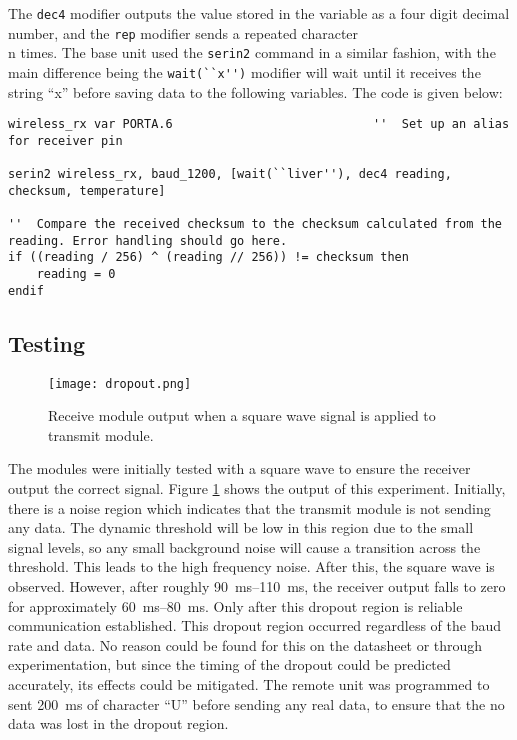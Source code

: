 The \verb|dec4| modifier outputs the value stored in the variable as a four digit decimal number, and the \verb|rep| modifier sends a repeated character \\n times. The base unit used the \verb|serin2| command in a similar fashion, with the main difference being the \verb|wait(``x'')| modifier will wait until it receives the string ``x'' before saving data to the following variables. The code is given below:

\begin{lstlisting}
wireless_rx var PORTA.6                            ''  Set up an alias for receiver pin

serin2 wireless_rx, baud_1200, [wait(``liver''), dec4 reading, checksum, temperature]

''  Compare the received checksum to the checksum calculated from the reading. Error handling should go here.
if ((reading / 256) ^ (reading // 256)) != checksum then
    reading = 0
endif
\end{lstlisting}





\subsection{Testing}
\begin{figure}[htbp]
	\centering
	\texttt{[image: dropout.png]}
	\caption{Receive module output when a square wave signal is applied to transmit module.}
	\label{fig: dropout}
\end{figure}

The modules were initially tested with a square wave to ensure the receiver output the correct signal. Figure \ref{fig: dropout} shows the output of this experiment. Initially, there is a noise region which indicates that the transmit module is not sending any data. The dynamic threshold will be low in this region due to the small signal levels, so any small background noise will cause a transition across the threshold. This leads to the high frequency noise. After this, the square wave is observed. However, after roughly \SIrange{90}{110}{\milli\second}, the receiver output falls to zero for approximately \SIrange{60}{80}{\milli\second}. Only after this dropout region is reliable communication established. This dropout region occurred regardless of the baud rate and data. No reason could be found for this on the datasheet or through experimentation, but since the timing of the dropout could be predicted accurately, its effects could be mitigated. The remote unit was programmed to sent \SI{200}{\milli\second} of character ``U'' before sending any real data, to ensure that the no data was lost in the dropout region.\\









